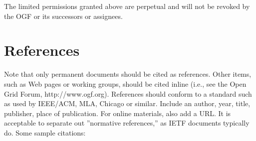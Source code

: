 \documentclass[10pt,a4paper]{article}
\begin{document}
The limited permissions granted above are perpetual and will not be revoked by the OGF or its successors or assignees.

\section{References}

Note that only permanent documents should be cited as references. Other items, such as Web pages or working groups, should be cited inline (i.e., see the Open Grid Forum, http://www.ogf.org). References should conform to a standard such as used by IEEE/ACM, MLA, Chicago or similar. Include an author, year, title, publisher, place of publication. For online materials, also add a URL. It is acceptable to separate out ''normative references,'' as IETF documents typically do. Some sample citations: 
\end{document}

